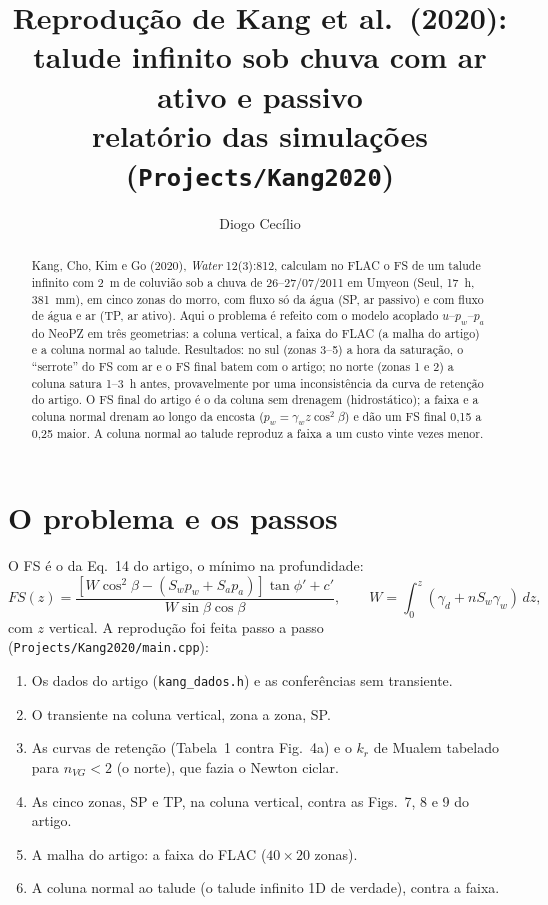 \documentclass[11pt,a4paper]{article}
\title{Reprodução de Kang et al.\ (2020): talude infinito sob chuva com ar ativo e passivo\\
\large relatório das simulações (\texttt{Projects/Kang2020})}
\author{Diogo Cecílio}
\date{\versao}
\begin{document}
\maketitle

\begin{abstract}
Kang, Cho, Kim e Go (2020), \emph{Water} 12(3):812, calculam no FLAC o FS de um talude infinito com 2~m de coluvião sob
a chuva de 26--27/07/2011 em Umyeon (Seul, 17~h, 381~mm), em cinco zonas do morro, com fluxo só da água (SP, ar
passivo) e com fluxo de água e ar (TP, ar ativo). Aqui o problema é refeito com o modelo acoplado $u$--$p_w$--$p_a$ do
NeoPZ em três geometrias: a coluna vertical, a faixa do FLAC (a malha do artigo) e a coluna normal ao talude.
Resultados: no sul (zonas 3--5) a hora da saturação, o ``serrote'' do FS com ar e o FS final batem com o artigo; no
norte (zonas 1 e 2) a coluna satura 1--3~h antes, provavelmente por uma inconsistência da curva de retenção do artigo.
O FS final do artigo é o da coluna sem drenagem (hidrostático); a faixa e a coluna normal drenam ao longo da encosta
($p_w = \gamma_w z\cos^2\beta$) e dão um FS final 0,15 a 0,25 maior. A coluna normal ao talude reproduz a faixa a um
custo vinte vezes menor.
\end{abstract}

\tableofcontents

\section{O problema e os passos}
O FS é o da Eq.~14 do artigo, o mínimo na profundidade:
\[
FS(z) = \frac{[W\cos^2\beta - (S_w p_w + S_a p_a)]\tan\phi' + c'}{W\sin\beta\cos\beta},\qquad
W = \int_0^z (\gamma_d + n S_w\gamma_w)\,dz,
\]
com $z$ vertical. A reprodução foi feita passo a passo (\texttt{Projects/Kang2020/main.cpp}):
\begin{enumerate}
  \item Os dados do artigo (\texttt{kang\_dados.h}) e as conferências sem transiente.
  \item O transiente na coluna vertical, zona a zona, SP.
  \item As curvas de retenção (Tabela~1 contra Fig.~4a) e o $k_r$ de Mualem tabelado para $n_{VG} < 2$ (o norte), que
    fazia o Newton ciclar.
  \item As cinco zonas, SP e TP, na coluna vertical, contra as Figs.~7, 8 e 9 do artigo.
  \item[6.] A malha do artigo: a faixa do FLAC ($40\times20$ zonas).
  \item[7.] A coluna normal ao talude (o talude infinito 1D de verdade), contra a faixa.
\end{enumerate}
\end{document}
